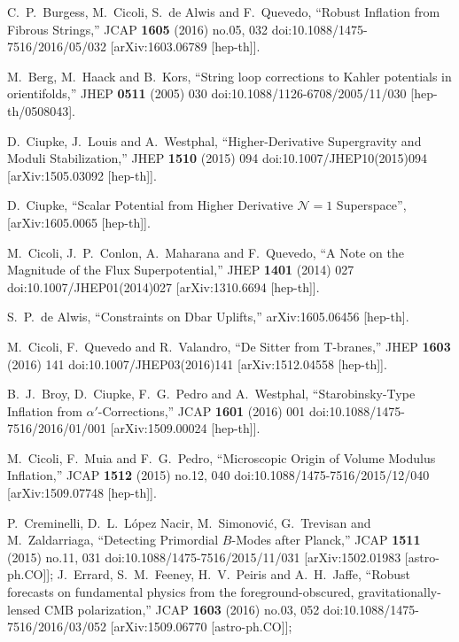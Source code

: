 \documentclass[11pt,a4paper]{article}
\begin{document}
\begin{thebibliography}{99}
  C.~P.~Burgess, M.~Cicoli, S.~de Alwis and F.~Quevedo,
  ``Robust Inflation from Fibrous Strings,''
  JCAP {\bf 1605} (2016) no.05,  032
  doi:10.1088/1475-7516/2016/05/032
  [arXiv:1603.06789 [hep-th]].

  M.~Berg, M.~Haack and B.~Kors,
  ``String loop corrections to Kahler potentials in orientifolds,''
  JHEP {\bf 0511} (2005) 030
  doi:10.1088/1126-6708/2005/11/030
  [hep-th/0508043].
	
  D.~Ciupke, J.~Louis and A.~Westphal,
  ``Higher-Derivative Supergravity and Moduli Stabilization,''
  JHEP {\bf 1510} (2015) 094
  doi:10.1007/JHEP10(2015)094
  [arXiv:1505.03092 [hep-th]].

D.~Ciupke, ``Scalar Potential from Higher Derivative $\mathcal{N} = 1$
  Superspace'', [arXiv:1605.0065 [hep-th]].
  
  M.~Cicoli, J.~P.~Conlon, A.~Maharana and F.~Quevedo,
  ``A Note on the Magnitude of the Flux Superpotential,''
  JHEP {\bf 1401} (2014) 027
  doi:10.1007/JHEP01(2014)027
  [arXiv:1310.6694 [hep-th]].

  S.~P.~de Alwis,
  ``Constraints on Dbar Uplifts,''
  arXiv:1605.06456 [hep-th].

  M.~Cicoli, F.~Quevedo and R.~Valandro,
  ``De Sitter from T-branes,''
  JHEP {\bf 1603} (2016) 141
  doi:10.1007/JHEP03(2016)141
  [arXiv:1512.04558 [hep-th]].

  B.~J.~Broy, D.~Ciupke, F.~G.~Pedro and A.~Westphal,
  ``Starobinsky-Type Inflation from $\alpha'$-Corrections,''
  JCAP {\bf 1601} (2016) 001
  doi:10.1088/1475-7516/2016/01/001
  [arXiv:1509.00024 [hep-th]].
	
  M.~Cicoli, F.~Muia and F.~G.~Pedro,
  ``Microscopic Origin of Volume Modulus Inflation,''
  JCAP {\bf 1512} (2015) no.12,  040
  doi:10.1088/1475-7516/2015/12/040
  [arXiv:1509.07748 [hep-th]].

  P.~Creminelli, D.~L.~López Nacir, M.~Simonović, G.~Trevisan and M.~Zaldarriaga,
  ``Detecting Primordial $B$-Modes after Planck,''
  JCAP {\bf 1511} (2015) no.11,  031
  doi:10.1088/1475-7516/2015/11/031
  [arXiv:1502.01983 [astro-ph.CO]];
	J.~Errard, S.~M.~Feeney, H.~V.~Peiris and A.~H.~Jaffe,
  ``Robust forecasts on fundamental physics from the foreground-obscured, gravitationally-lensed CMB polarization,''
  JCAP {\bf 1603} (2016) no.03,  052
  doi:10.1088/1475-7516/2016/03/052
  [arXiv:1509.06770 [astro-ph.CO]];


\end{thebibliography}
\end{document}
